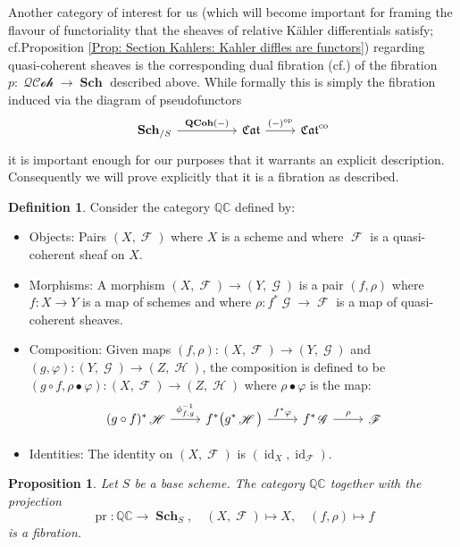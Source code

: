 \documentclass{amsart}
\newtheorem{proposition}[equation]{Proposition}
\theoremstyle{definition}
\newtheorem{definition}[equation]{Definition}
\DeclareMathOperator{\Fscr}{\mathscr{F}}
\DeclareMathOperator{\Gscr}{\mathscr{G}}
\DeclareMathOperator{\Hscr}{\mathscr{H}}
\DeclareMathOperator{\id}{id}
\DeclareMathOperator{\fCat}{\mathfrak{Cat}}
\DeclareMathOperator{\op}{op}
\DeclareMathOperator{\Sch}{\mathbf{Sch}}
\DeclareMathOperator{\QCoh}{\mathbf{QCoh}}
\DeclareMathOperator{\QQCoh}{\mathcal{QCoh}}
\DeclareMathOperator{\pr}{pr}
\numberwithin{equation}{subsection}
\begin{document}
Another category of interest for us (which will become important for framing the flavour of functoriality that the sheaves of relative K{\"a}hler differentials satisfy; cf.\@ Proposition \ref{Prop: Section Kahlers: Kahler diffles are functors}) regarding quasi-coherent sheaves is the corresponding dual fibration (cf.\@ \cite[Definition 8.3.5]{BorceuxHandBook2}) of the fibration $p:\QQCoh \to \Sch$ described above. While formally this is simply the fibration induced via the diagram of pseudofunctors
\[
\begin{tikzcd}
\Sch_{/S} \ar[rr]{}{\QCoh(-)} & &\fCat \ar[r]{}{(-)^{\op}} & \fCat^{\operatorname{co}}
\end{tikzcd}
\]
it is important enough for our purposes that it warrants an explicit description. Consequently we will prove explicitly that it is a fibration as described.
\begin{definition}
Consider the category $\mathbb{QC}$ defined by:
\begin{itemize}
	\item Objects: Pairs $(X,\Fscr)$ where $X$ is a scheme and where $\Fscr$ is a quasi-coherent sheaf on $X$.
	\item Morphisms: A morphism $(X,\Fscr) \to (Y,\Gscr)$ is a pair $(f,\rho)$ where $f:X \to Y$ is a map of schemes and where $\rho:f^{\ast}\Gscr \to \Fscr$ is a map of quasi-coherent sheaves.
	\item Composition: Given maps $(f,\rho):(X,\Fscr) \to (Y,\Gscr)$ and $(g,\varphi):(Y,\Gscr) \to (Z,\Hscr)$, the composition is defined to be $(g \circ f, \rho \bullet \varphi):(X,\Fscr) \to (Z,\Hscr)$ where $\rho \bullet \varphi$ is the map:
	\[
	\begin{tikzcd}
	(g \circ f)^{\ast}\Hscr \ar[r]{}{\phi_{f,g}^{-1}} & f^{\ast}\big(g^{\ast}\Hscr\big) \ar[r]{}{f^{\ast}\varphi} & f^{\ast}\Gscr \ar[r]{}{\rho} & \Fscr
	\end{tikzcd}
	\]
	\item Identities: The identity on $(X,\Fscr)$ is $(\id_X,\id_{\Fscr})$.
\end{itemize}
\end{definition}
\begin{proposition}\label{Prop: Section Background Scheme: QCoh cofibration}
Let $S$ be a base scheme. The category $\mathbb{QC}$ together with the projection 
\[
\pr:\mathbb{QC} \to \Sch_{S}, \quad (X,\Fscr) \mapsto X, \quad (f,\rho) \mapsto f
\]
is a fibration.
\end{proposition}
\end{document}
